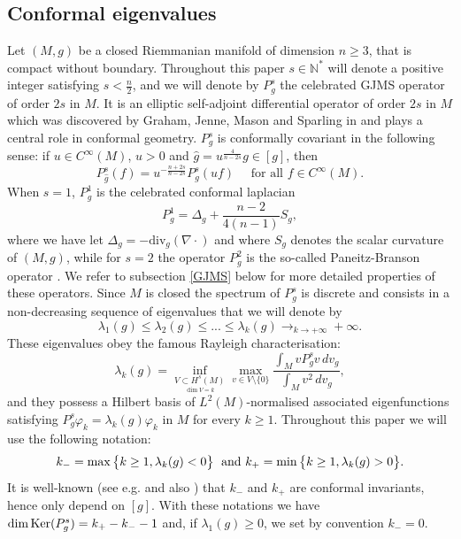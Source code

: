 \documentclass[10pt]{amsart}
\numberwithin{equation}{section}
\newcommand{\N}{\mathbb{N}}
\def\la{{\lambda}}
\def\ker{{\mathop{\rm Ker}}}
\newcommand{\vp}{\varphi}
\theoremstyle{plain}
\theoremstyle{remark}
\begin{document}
\subsection{Conformal eigenvalues}


Let $(M,g)$ be a closed Riemmanian manifold of dimension $n \geq 3$, that is compact without boundary. Throughout this paper $s\in \N^*$ will denote a positive integer satisfying $s < \frac{n}{2}$, and we will denote by $P_g^s$ the celebrated GJMS operator of order $2s$ in $M$. It is an elliptic self-adjoint differential operator of order $2s$ in $M$ which was discovered by Graham, Jenne, Mason and Sparling in \cite{GJMS} and plays a central role in conformal geometry. $P_g^s$ is conformally covariant in the following sense: if $u \in C^\infty(M)$, $u>0$ and $\hat{g}  = u^{\frac{4}{n-2s}}g \in [g]$, then 
\begin{equation*} 
P_{\hat g}^s (f)  =  u^{- \frac{n+2s}{n-2s}} P_g^s(u f) \quad \text{ for all } f \in C^\infty(M). 
\end{equation*}
When $s=1$, $P_g^1$ is the celebrated conformal laplacian
$$ P_g^1 = \Delta_g + \frac{n-2}{4(n-1)} S_g,$$
where we have let $\Delta_g = - \text{div}_g(\nabla \cdot)$ and where $S_g$ denotes the scalar curvature of $(M,g)$, while for $s=2$ the operator $P_g^2$ is the so-called Paneitz-Branson operator \cite{Branson, Paneitz}. We refer to subsection \ref{GJMS} below for more detailed properties of these operators. 
Since $M$ is closed the spectrum of $P_g^s$ is discrete and consists in a non-decreasing sequence of eigenvalues that we will denote by 
$$\la_1(g) \leq \la_2(g) \leq ... \leq \la_k(g) \rightarrow_{k \to +\infty} +\infty.$$
These eigenvalues obey the famous Rayleigh characterisation: 
\begin{equation*} 
 \la_k (g)= \inf_{\underset{\dim V = k}{V \subset H^s(M)}}\max_{v \in V \setminus \{0\}}  \frac{\int_M v P_g^s v \, dv_g}{\int_M v^2 \, dv_g},
 \end{equation*}
and they possess a Hilbert basis of $L^2(M)$-normalised associated eigenfunctions satisfying $P_g^s \vp_k = \lambda_k(g) \vp_k$ in $M$ for every $k \ge 1$. Throughout this paper we will use the following notation: 
$$k_- = \max \big\{k \geq 1,  \la_k(g)<0 \big\} \; \hbox{ and } k_+= \min  \big \{k \geq 1, \la_k(g)>0 \big\}.$$
It is well-known (see e.g. \cite{CanzaniGoverJakobsonPonge} and also \cite{ElSayed}) that $k_-$ and $k_+$ are conformal invariants, hence only depend on $[g]$. With these notations we have $\dim \ker (P_g^s) = k_+-k_- - 1$ and, if $\la_1(g) \geq 0$, we set by convention $k_-=0$. 
\end{document}
